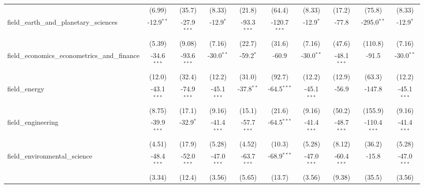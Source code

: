 \begin{tabular}{lccccccccc}
                                                               & (6.99)        & (35.7)         & (8.33)        & (21.8)         & (64.4)         & (8.33)        & (17.2)         & (75.8)         & (8.33)\\   
   field\_earth\_and\_planetary\_sciences                      & -12.9$^{**}$  & -27.9$^{***}$  & -12.9$^{*}$   & -93.3$^{***}$  & -120.7$^{***}$ & -12.9$^{*}$   & -77.8          & -295.0$^{**}$  & -12.9$^{*}$\\   
                                                               & (5.39)        & (9.08)         & (7.16)        & (22.7)         & (31.6)         & (7.16)        & (47.6)         & (110.8)        & (7.16)\\   
   field\_economics\_econometrics\_and\_finance                & -34.6$^{***}$ & -93.6$^{***}$  & -30.0$^{**}$  & -59.2$^{*}$    & -60.9          & -30.0$^{**}$  & -48.1$^{***}$  & -91.5          & -30.0$^{**}$\\   
                                                               & (12.0)        & (32.4)         & (12.2)        & (31.0)         & (92.7)         & (12.2)        & (12.9)         & (63.3)         & (12.2)\\   
   field\_energy                                               & -43.1$^{***}$ & -74.9$^{***}$  & -45.1$^{***}$ & -37.8$^{**}$   & -64.5$^{***}$  & -45.1$^{***}$ & -56.9          & -147.8         & -45.1$^{***}$\\   
                                                               & (8.75)        & (17.1)         & (9.16)        & (15.1)         & (21.6)         & (9.16)        & (50.2)         & (155.9)        & (9.16)\\   
   field\_engineering                                          & -39.9$^{***}$ & -32.9$^{*}$    & -41.4$^{***}$ & -57.7$^{***}$  & -64.5$^{***}$  & -41.4$^{***}$ & -48.7$^{***}$  & -110.4$^{***}$ & -41.4$^{***}$\\   
                                                               & (4.51)        & (17.9)         & (5.28)        & (4.52)         & (10.3)         & (5.28)        & (8.12)         & (36.2)         & (5.28)\\   
   field\_environmental\_science                               & -48.4$^{***}$ & -52.0$^{***}$  & -47.0$^{***}$ & -63.7$^{***}$  & -68.9$^{***}$  & -47.0$^{***}$ & -60.4$^{***}$  & -15.8          & -47.0$^{***}$\\   
                                                               & (3.34)        & (12.4)         & (3.56)        & (5.65)         & (13.7)         & (3.56)        & (9.38)         & (35.5)         & (3.56)\\   

\end{tabular}

